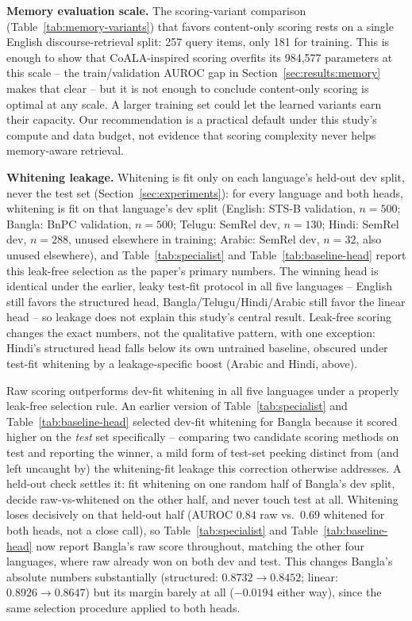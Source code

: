 \documentclass[manuscript]{acmart}
\begin{document}
\textbf{Memory evaluation scale.} The scoring-variant comparison (Table~\ref{tab:memory-variants}) that favors content-only scoring rests on a single English discourse-retrieval split: 257 query items, only 181 for training. This is enough to show that CoALA-inspired scoring overfits its 984,577 parameters at this scale -- the train/validation AUROC gap in Section~\ref{sec:results:memory} makes that clear -- but it is not enough to conclude content-only scoring is optimal at any scale. A larger training set could let the learned variants earn their capacity. Our recommendation is a practical default under this study's compute and data budget, not evidence that scoring complexity never helps memory-aware retrieval.

\textbf{Whitening leakage.} Whitening is fit only on each language's held-out dev split, never the test set (Section~\ref{sec:experiments}): for every language and both heads, whitening is fit on that language's dev split (English: STS-B validation, $n{=}500$; Bangla: BnPC validation, $n{=}500$; Telugu: SemRel dev, $n{=}130$; Hindi: SemRel dev, $n{=}288$, unused elsewhere in training; Arabic: SemRel dev, $n{=}32$, also unused elsewhere), and Table~\ref{tab:specialist} and Table~\ref{tab:baseline-head} report this leak-free selection as the paper's primary numbers. The winning head is identical under the earlier, leaky test-fit protocol in all five languages -- English still favors the structured head, Bangla/Telugu/Hindi/Arabic still favor the linear head -- so leakage does not explain this study's central result. Leak-free scoring changes the exact numbers, not the qualitative pattern, with one exception: Hindi's structured head falls below its own untrained baseline, obscured under test-fit whitening by a leakage-specific boost (Arabic and Hindi, above).

Raw scoring outperforms dev-fit whitening in all five languages under a properly leak-free selection rule. An earlier version of Table~\ref{tab:specialist} and Table~\ref{tab:baseline-head} selected dev-fit whitening for Bangla because it scored higher on the \emph{test} set specifically -- comparing two candidate scoring methods on test and reporting the winner, a mild form of test-set peeking distinct from (and left uncaught by) the whitening-fit leakage this correction otherwise addresses. A held-out check settles it: fit whitening on one random half of Bangla's dev split, decide raw-vs-whitened on the other half, and never touch test at all. Whitening loses decisively on that held-out half (AUROC $0.84$ raw vs.\ $0.69$ whitened for both heads, not a close call), so Table~\ref{tab:specialist} and Table~\ref{tab:baseline-head} now report Bangla's raw score throughout, matching the other four languages, where raw already won on both dev and test. This changes Bangla's absolute numbers substantially (structured: $0.8732\to0.8452$; linear: $0.8926\to0.8647$) but its margin barely at all ($-0.0194$ either way), since the same selection procedure applied to both heads.
\end{document}
